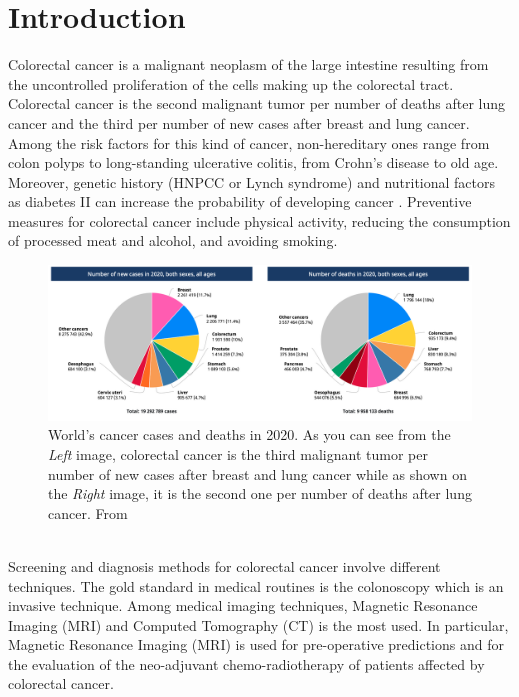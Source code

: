 \documentclass{standalone}
\begin{document}
\chapter*{Introduction}

Colorectal cancer is a malignant neoplasm of the large intestine resulting from the uncontrolled proliferation of the cells making up the colorectal tract.
Colorectal cancer is the second malignant tumor per number of deaths after lung cancer and the third per number of new cases after breast and lung cancer\cite{cancerstats}.\\
Among the risk factors for this kind of cancer, non-hereditary ones range from colon polyps to long-standing ulcerative colitis, from Crohn's disease to old age. 
Moreover, genetic history (HNPCC or Lynch syndrome) and nutritional factors as diabetes II can increase the probability of developing cancer \cite{tesicoppola}.
Preventive measures for colorectal cancer include physical activity, reducing the consumption of processed meat and alcohol, and avoiding smoking\cite{stats2019}.
\begin{figure}[h!]
	\centering
	\includegraphics[width=\linewidth]{../images/cancerstats.png}
	\caption{World's cancer cases and deaths in 2020. As you can see from the \textit{Left} image, colorectal cancer is the third malignant tumor per number of new cases after breast and lung cancer while as shown on the \textit{Right} image, it is the second one per number of deaths after lung cancer. From \cite{cancerstats} }
\end{figure}
\\
Screening and diagnosis methods for colorectal cancer involve different techniques. 
The gold standard in medical routines is the colonoscopy which is an invasive technique\cite{jovana}.
Among medical imaging techniques, Magnetic Resonance Imaging (MRI) and Computed Tomography (CT) is the most used\cite{tesicoppola}. 
In particular, Magnetic Resonance Imaging (MRI) is used for pre-operative predictions and for the evaluation of the neo-adjuvant chemo-radiotherapy of patients affected by colorectal cancer\cite{tesicoppola}.
\end{document}
